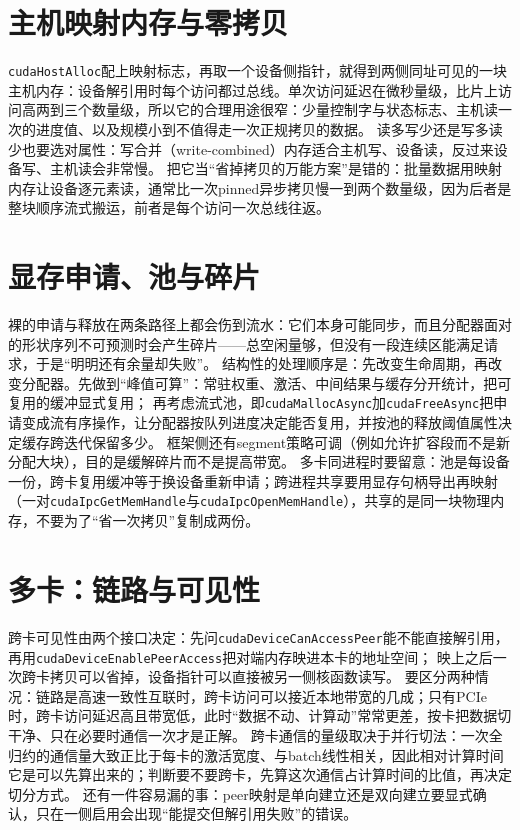 \documentclass[12pt,a4paper,fontset=fandol]{ctexbook}
\newcommand{\Tp}[1]{\texttt{#1}}
\begin{document}
\section{主机映射内存与零拷贝}

\Tp{cudaHostAlloc}配上映射标志，再取一个设备侧指针，就得到两侧同址可见的一块主机内存：设备解引用时每个访问都过总线。单次访问延迟在微秒量级，比片上访问高两到三个数量级，所以它的合理用途很窄：少量控制字与状态标志、主机读一次的进度值、以及规模小到不值得走一次正规拷贝的数据。
读多写少还是写多读少也要选对属性：写合并（write-combined）内存适合主机写、设备读，反过来设备写、主机读会非常慢。
把它当``省掉拷贝的万能方案''是错的：批量数据用映射内存让设备逐元素读，通常比一次pinned异步拷贝慢一到两个数量级，因为后者是整块顺序流式搬运，前者是每个访问一次总线往返。

\section{显存申请、池与碎片}

裸的申请与释放在两条路径上都会伤到流水：它们本身可能同步，而且分配器面对的形状序列不可预测时会产生碎片——总空闲量够，但没有一段连续区能满足请求，于是``明明还有余量却失败''。
结构性的处理顺序是：先改变生命周期，再改变分配器。先做到``峰值可算''：常驻权重、激活、中间结果与缓存分开统计，把可复用的缓冲显式复用；
再考虑流式池，即\Tp{cudaMallocAsync}加\Tp{cudaFreeAsync}把申请变成流有序操作，让分配器按队列进度决定能否复用，并按池的释放阈值属性决定缓存跨迭代保留多少。
框架侧还有segment策略可调（例如允许扩容段而不是新分配大块），目的是缓解碎片而不是提高带宽。
多卡同进程时要留意：池是每设备一份，跨卡复用缓冲等于换设备重新申请；跨进程共享要用显存句柄导出再映射（一对\Tp{cudaIpcGetMemHandle}与\Tp{cudaIpcOpenMemHandle}），共享的是同一块物理内存，不要为了``省一次拷贝''复制成两份。

\section{多卡：链路与可见性}

跨卡可见性由两个接口决定：先问\Tp{cudaDeviceCanAccessPeer}能不能直接解引用，
再用\Tp{cudaDeviceEnablePeerAccess}把对端内存映进本卡的地址空间；
映上之后一次跨卡拷贝可以省掉，设备指针可以直接被另一侧核函数读写。
要区分两种情况：链路是高速一致性互联时，跨卡访问可以接近本地带宽的几成；只有PCIe时，跨卡访问延迟高且带宽低，此时``数据不动、计算动''常常更差，按卡把数据切干净、只在必要时通信一次才是正解。
跨卡通信的量级取决于并行切法：一次全归约的通信量大致正比于每卡的激活宽度、与batch线性相关，因此相对计算时间它是可以先算出来的；判断要不要跨卡，先算这次通信占计算时间的比值，再决定切分方式。
还有一件容易漏的事：peer映射是单向建立还是双向建立要显式确认，只在一侧启用会出现``能提交但解引用失败''的错误。
\end{document}
